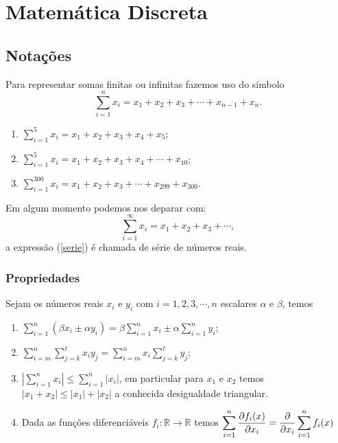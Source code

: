 
\chapter{Matemática Discreta}

\section{Notações}
 Para representar somas finitas ou infinitas fazemos uso do símbolo
 \begin{equation}
     \sum_{i=1}^{n} x_i = x_1 + x_2 + x_3 + \cdots + x_{n-1} + x_{n}.
 \end{equation}
\begin{example}

\begin{enumerate}
    \item [(i)] $\displaystyle \sum_{i=1}^{5} x_i = x_1 + x_2 + x_3 + x_{4} + x_{5}$;
    \item [(ii)] $\displaystyle \sum_{i=1}^{5} x_i = x_1 + x_2 + x_3 + x_{4} + \cdots + x_{10}$;
    \item [(iii)] $\displaystyle \sum_{i=1}^{300} x_i = x_1 + x_2 + x_3 + \cdots+ x_{299} + x_{300}$.
\end{enumerate}

\end{example}
\quad Em algum momento podemos nos deparar com:
\begin{equation}
\label{serie}
     \sum_{i=1}^{\infty} x_i = x_1 + x_2 + x_3 + \cdots,
 \end{equation}
a expressão (\ref{serie}) é chamada de série de números reais. 
\subsection{Propriedades}
Sejam os números reais $x_i$ e $y_i$ com $i = 1,2,3,\cdots,n$ escalares $\alpha$ e $\beta$, temos 
\begin{enumerate}
    \item [(i)] $\displaystyle \sum_{i=1}^{n} (\beta x_i\pm \alpha y_i) = \displaystyle \beta \sum_{i=1}^{n} x_i \pm \displaystyle \alpha \sum_{i=1}^{n} y_i $;
    \item[(ii)] $\displaystyle \sum^n_{i = m} \sum^\ell_{j = k} x_iy_j = \sum^n_{i = m} x_i\sum^\ell_{j = k} y_j$;
    \item[(iii)] $\displaystyle \left|\sum^n_{i = 1} x_i \right| \leq  \sum^n_{i = 1} |x_i|$, em particular para $x_1$ e $x_2$ temos $|x_1 + x_2| \leq |x_1| + |x_2|$ a conhecida desigualdade triangular.
    \item[(iv)] Dada as funções diferenciáveis $f_i: \mathbb{R} \rightarrow \mathbb{R}$ temos $\displaystyle \sum^n_{i = 1}  \frac{\partial f_i(x)}{\partial x_i} = \frac{\partial \displaystyle }{\partial x_i}\sum^n_{i = 1}f_i(x) $  
     
\end{enumerate}

